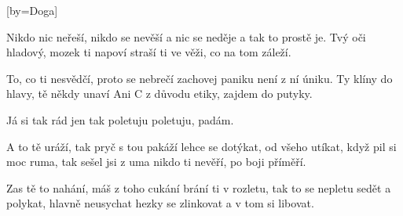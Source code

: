 [by={Doga}]

\beginverse{}
Nikdo nic neřeší, nikdo se nevěší
a nic se neděje a tak to prostě je.
Tvý oči hladový, mozek ti napoví
straší ti ve věži, co na tom záleží.
\endverse{}

\beginverse{}
To, co ti nesvědčí, proto se nebrečí
zachovej paniku není z ní úniku.
Ty klíny do hlavy, tě někdy unaví
Ani C
z důvodu etiky, zajdem do putyky.
\endverse{}

\beginchorus{}
\lrep{} Já si tak rád jen tak poletuju poletuju, padám. \rrep{}
\endchorus{}

\beginverse*{}
   
   
\endverse{}

\beginverse{}
A to tě uráží, tak pryč s tou pakáží
lehce se dotýkat, od všeho utíkat,
když pil si moc ruma, tak sešel jsi z uma
nikdo ti nevěří, po boji příměří.
\endverse{}

\beginverse{}
Zas tě to nahání, máš z toho cukání
brání ti v rozletu, tak to se nepletu
sedět a polykat, hlavně neusychat
hezky se zlinkovat a v tom si libovat.
\endverse{}

\beginchorus{}
\phantom{}
\endchorus{}

\beginverse*{}
   
   
\endverse{}

\beginchorus{}
\phantom{}
\endchorus{}

\beginverse*{}
  
\endverse{}

\endsong{}
